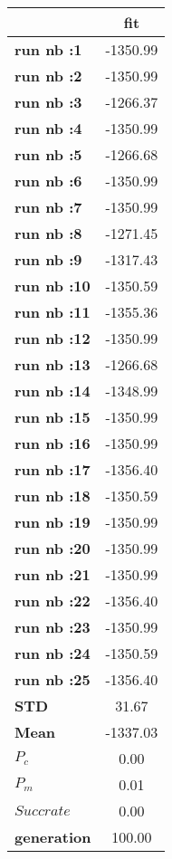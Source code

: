 \begin{tiny}\begin{tabular}{|l|c|}
\hline
&\textbf{fit}\\\hline
\textbf{run nb :1}&-1350.99\\\hline
\textbf{run nb :2}&-1350.99\\\hline
\textbf{run nb :3}&-1266.37\\\hline
\textbf{run nb :4}&-1350.99\\\hline
\textbf{run nb :5}&-1266.68\\\hline
\textbf{run nb :6}&-1350.99\\\hline
\textbf{run nb :7}&-1350.99\\\hline
\textbf{run nb :8}&-1271.45\\\hline
\textbf{run nb :9}&-1317.43\\\hline
\textbf{run nb :10}&-1350.59\\\hline
\textbf{run nb :11}&-1355.36\\\hline
\textbf{run nb :12}&-1350.99\\\hline
\textbf{run nb :13}&-1266.68\\\hline
\textbf{run nb :14}&-1348.99\\\hline
\textbf{run nb :15}&-1350.99\\\hline
\textbf{run nb :16}&-1350.99\\\hline
\textbf{run nb :17}&-1356.40\\\hline
\textbf{run nb :18}&-1350.59\\\hline
\textbf{run nb :19}&-1350.99\\\hline
\textbf{run nb :20}&-1350.99\\\hline
\textbf{run nb :21}&-1350.99\\\hline
\textbf{run nb :22}&-1356.40\\\hline
\textbf{run nb :23}&-1350.99\\\hline
\textbf{run nb :24}&-1350.59\\\hline
\textbf{run nb :25}&-1356.40\\\hline
\textbf{STD}&31.67\\\hline
\textbf{Mean}&-1337.03\\\hline
\textbf{$P_c$}&0.00\\\hline
\textbf{$P_{m}$}&0.01\\\hline
\textbf{$Succ rate$}&0.00\\\hline
\textbf{generation}&100.00\\\hline
\end{tabular}
\end{tiny}